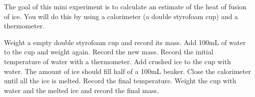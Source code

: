 \documentclass[main.tex]{subfiles}
\begin{document}
\newpage
\begin{fullwidth}

\vspace{0.2cm}{\large \bfseries 3. Heat of fusion of ice}
The goal of this mini experiment is to calculate an estimate of the heat of fusion of ice. You will do this by using a calorimeter (a double styrofoam cup) and a thermometer.
\begin{steps}
    \newstep[] Weight a empty double styrofoam cup and record its mass.
 \newstep[] Add 100mL of water to the cup and weight again. Record the new mass.
  \newstep[] Record the initial temperature of water with a thermometer.
   \newstep[] Add crushed ice to the cup with water. The amount of ice should fill half of a 100mL beaker. 
    \newstep[] Close the calorimeter until all the ice is melted. Record the final temperature.
     \newstep[] Weight the cup with water and the melted ice and record the final mass.
\end{steps}



\end{fullwidth}
\end{document}
